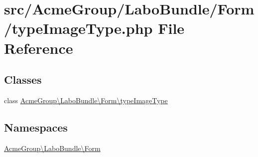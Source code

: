 \hypertarget{type_image_type_8php}{\section{src/\+Acme\+Group/\+Labo\+Bundle/\+Form/type\+Image\+Type.php File Reference}
\label{type_image_type_8php}
}
\subsection*{Classes}
\begin{DoxyCompactItemize}
\item 
class \hyperlink{class_acme_group_1_1_labo_bundle_1_1_form_1_1type_image_type}{Acme\+Group\textbackslash{}\+Labo\+Bundle\textbackslash{}\+Form\textbackslash{}type\+Image\+Type}
\end{DoxyCompactItemize}
\subsection*{Namespaces}
\begin{DoxyCompactItemize}
\item 
 \hyperlink{namespace_acme_group_1_1_labo_bundle_1_1_form}{Acme\+Group\textbackslash{}\+Labo\+Bundle\textbackslash{}\+Form}
\end{DoxyCompactItemize}

